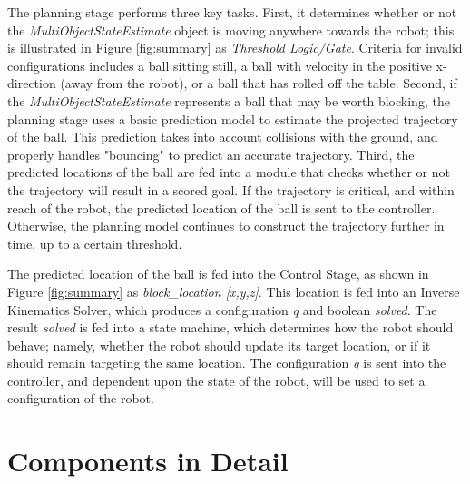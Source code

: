 \documentclass{article}
\begin{document}
The planning stage performs three key tasks. First, it determines whether or not the \emph{MultiObjectStateEstimate} object is moving anywhere towards the robot; this is illustrated in Figure \ref{fig:summary} as \emph{Threshold Logic/Gate}. Criteria for invalid configurations includes a ball sitting still, a ball with velocity in the positive x-direction (away from the robot), or a ball that has rolled off the table. Second, if the \emph{MultiObjectStateEstimate} represents a ball that may be worth blocking, the planning stage uses a basic prediction model to estimate the projected trajectory of the ball. This prediction takes into account collisions with the ground, and properly handles "bouncing" to predict an accurate trajectory. Third, the predicted locations of the ball are fed into a module that checks whether or not the trajectory will result in a scored goal. If the trajectory is critical, and within reach of the robot, the predicted location of the ball is sent to the controller. Otherwise, the planning model continues to construct the trajectory further in time, up to a certain threshold. \par 

The predicted location of the ball is fed into the Control Stage, as shown in Figure \ref{fig:summary} as \emph{block\_location [x,y,z]}. This location is fed into an Inverse Kinematics Solver, which produces a configuration \emph{q} and boolean \emph{solved}. The result \emph{solved} is fed into a state machine, which determines how the robot should behave; namely, whether the robot should update its target location, or if it should remain targeting the same location. The configuration \emph{q} is sent into the controller, and dependent upon the state of the robot, will be used to set a configuration of the robot. 




\section{Components in Detail}

\end{document}
